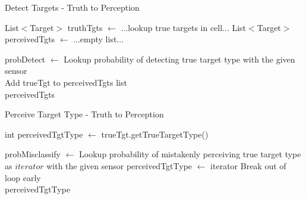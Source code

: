 \begin{algorithm}[H]
	\caption{Detect Targets - Truth to Perception}
	\label{alg:detectTgts}
	\begin{algorithmic}[1]
			\State List$<$Target$>$ truthTgts $\gets$ ...lookup true targets in cell...
			\State List$<$Target$>$ perceivedTgts $\gets$ ...empty list...

				\State probDetect $\gets$ Lookup probability of detecting true target type with the given sensor
				 \\
					\State Add trueTgt to perceivedTgts list
				\EndIf
			\EndFor \\
			\Return perceivedTgts
		\EndFunction
	\end{algorithmic}
\end{algorithm}

\begin{algorithm}[H]
	\caption{Perceive Target Type - Truth to Perception}
	\label{alg:perceiveTgt}
	\begin{algorithmic}[1]
		\State int perceivedTgtType $\gets$ trueTgt.getTrueTargetType()
		
				\State probMisclassify $ \gets $ Lookup probability of mistakenly perceiving true target type as $iterator$ with the given sensor
					\State perceivedTgtType $\gets$ iterator
					\State Break out of loop early
				\EndIf
			\EndIf
		\EndFor\\

		\Return perceivedTgtType
		\EndFunction
	\end{algorithmic}
\end{algorithm}

